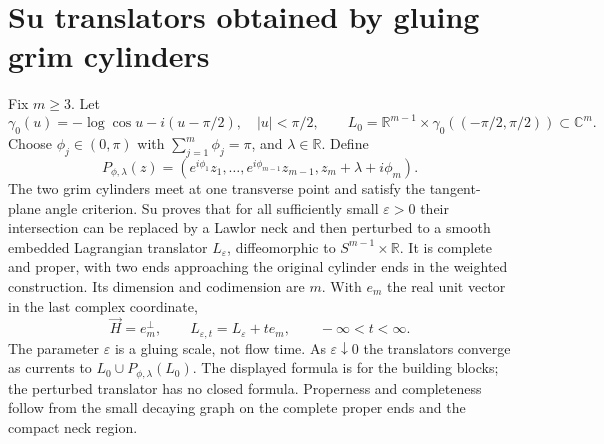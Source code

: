 \chapter{Su translators obtained by gluing grim cylinders}\label{sec:catalogue-su-glued-translators}
\begin{example}\label{ex:catalogue-su-glued-translators}
Fix $m\geq3$. Let
\[
 \gamma_0(u)=-\log\cos u-i(u-\pi/2),\quad |u|<\pi/2,\qquad
 L_0=\mathbb R^{m-1}\times\gamma_0((-\pi/2,\pi/2))\subset\mathbb C^m.
\]
Choose $\phi_j\in(0,\pi)$ with $\sum_{j=1}^m\phi_j=\pi$, and $\lambda\in\mathbb R$. Define
\[
 P_{\phi,\lambda}(z)=(e^{i\phi_1}z_1,\ldots,e^{i\phi_{m-1}}z_{m-1},z_m+\lambda+i\phi_m).
\]
The two grim cylinders meet at one transverse point and satisfy the tangent-plane angle criterion. Su proves that for all sufficiently small $\varepsilon>0$ their intersection can be replaced by a Lawlor neck and then perturbed to a smooth embedded Lagrangian translator $L_\varepsilon$, diffeomorphic to $S^{m-1}\times\mathbb R$. It is complete and proper, with two ends approaching the original cylinder ends in the weighted construction. Its dimension and codimension are $m$. With $e_m$ the real unit vector in the last complex coordinate,
\[
 \vec H=e_m^\perp,\qquad L_{\varepsilon,t}=L_\varepsilon+t e_m,\qquad -\infty<t<\infty.
\]
The parameter $\varepsilon$ is a gluing scale, not flow time. As $\varepsilon\downarrow0$ the translators converge as currents to $L_0\cup P_{\phi,\lambda}(L_0)$. The displayed formula is for the building blocks; the perturbed translator has no closed formula. Properness and completeness follow from the small decaying graph on the complete proper ends and the compact neck region.


\end{example}
